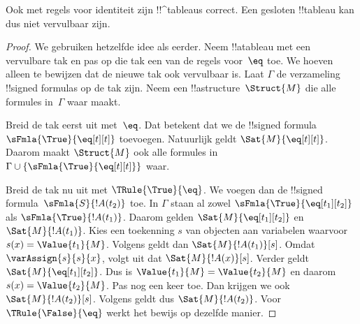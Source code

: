 \documentclass[../../../include/open-logic-section]{subfiles}
\begin{document}


\begin{prop}
Ook met regels voor identiteit zijn !!^{tableau}s correct. Een gesloten
!!{tableau} kan dus niet vervulbaar zijn.
\end{prop}

\begin{proof}
We gebruiken hetzelfde idee als eerder. Neem !!a{tableau} met een
vervulbare tak en pas op die tak een van de regels voor~$\eq$ toe. We
hoeven alleen te bewijzen dat de nieuwe tak ook vervulbaar is. Laat
$\Gamma$ de verzameling !!{signed formula}s op de tak zijn. Neem een
!!a{structure}~$\Struct{M}$ die alle formules in~$\Gamma$ waar maakt.

Breid de tak eerst uit met~$\eq$. Dat betekent dat we de
!!{signed formula}~$\sFmla{\True}{\eq[t][t]}$ toevoegen. Natuurlijk
geldt $\Sat{M}{\eq[t][t]}$. Daarom maakt $\Struct{M}$ ook alle formules
in $\Gamma \cup \{\sFmla{\True}{\eq[t][t]}\}$ waar.

Breid de tak nu uit met $\TRule{\True}{\eq}$. We voegen dan de
!!{signed formula}~$\sFmla{S}{!A(t_2)}$ toe. In $\Gamma$ staan al
zowel $\sFmla{\True}{\eq[t_1][t_2]}$ als
$\sFmla{\True}{!A(t_1)}$. Daarom gelden
$\Sat{M}{\eq[t_1][t_2]}$ en $\Sat{M}{!A(t_1)}$. Kies een toekenning
$s$ van objecten aan variabelen waarvoor
$s(x) = \Value{t_1}{M}$. Volgens
 geldt dan
$\Sat{M}{!A(t_1)}[s]$. Omdat $\varAssign{s}{s}{x}$, volgt uit
 dat $\Sat{M}{!A(x)}[s]$. Verder
geldt $\Sat{M}{\eq[t_1][t_2]}$. Dus is
$\Value{t_1}{M} = \Value{t_2}{M}$ en daarom
$s(x) = \Value{t_2}{M}$. Pas
 nog een keer toe. Dan krijgen we
ook $\Sat{M}{!A(t_2)}[s]$. Volgens
 geldt dus
$\Sat{M}{!A(t_2)}$. Voor $\TRule{\False}{\eq}$ werkt het bewijs op
dezelfde manier.
\end{proof}
\end{document}
